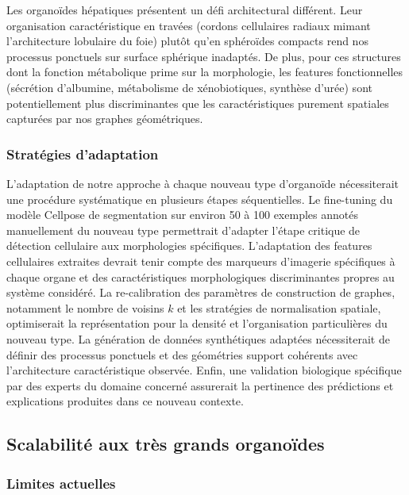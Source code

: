 Les organoïdes hépatiques présentent un défi architectural différent. Leur organisation caractéristique en travées (cordons cellulaires radiaux mimant l'architecture lobulaire du foie) plutôt qu'en sphéroïdes compacts rend nos processus ponctuels sur surface sphérique inadaptés. De plus, pour ces structures dont la fonction métabolique prime sur la morphologie, les features fonctionnelles (sécrétion d'albumine, métabolisme de xénobiotiques, synthèse d'urée) sont potentiellement plus discriminantes que les caractéristiques purement spatiales capturées par nos graphes géométriques.

\subsubsection{Stratégies d'adaptation}

L'adaptation de notre approche à chaque nouveau type d'organoïde nécessiterait une procédure systématique en plusieurs étapes séquentielles. Le fine-tuning du modèle Cellpose de segmentation sur environ 50 à 100 exemples annotés manuellement du nouveau type permettrait d'adapter l'étape critique de détection cellulaire aux morphologies spécifiques. L'adaptation des features cellulaires extraites devrait tenir compte des marqueurs d'imagerie spécifiques à chaque organe et des caractéristiques morphologiques discriminantes propres au système considéré. La re-calibration des paramètres de construction de graphes, notamment le nombre de voisins $k$ et les stratégies de normalisation spatiale, optimiserait la représentation pour la densité et l'organisation particulières du nouveau type. La génération de données synthétiques adaptées nécessiterait de définir des processus ponctuels et des géométries support cohérents avec l'architecture caractéristique observée. Enfin, une validation biologique spécifique par des experts du domaine concerné assurerait la pertinence des prédictions et explications produites dans ce nouveau contexte.

\subsection{Scalabilité aux très grands organoïdes}

\subsubsection{Limites actuelles}

